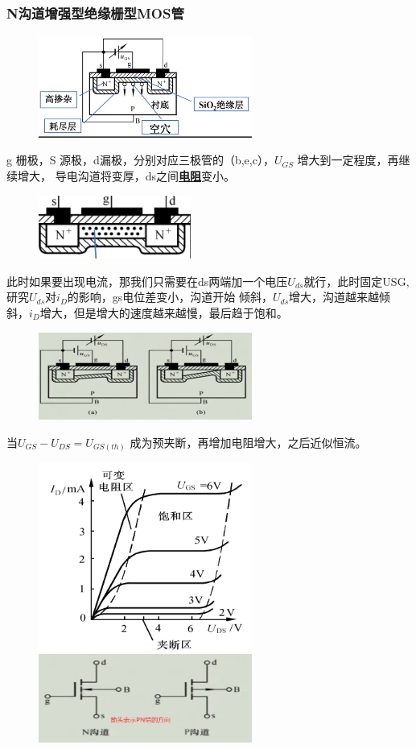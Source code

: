 \subsubsection{N沟道增强型绝缘栅型MOS管}
        \begin{figure}[H]
            \centering
            \includegraphics[width=7cm]{img/1.3.png}
            \end{figure}
g 栅极，S 源极，d漏极，分别对应三极管的（b,e,c），$U_{GS}$ 增大到一定程度，再继续增大，
导电沟道将变厚，ds之间\underline{\textbf{电阻}}变小。
        \begin{figure}[H]
            \centering
            \includegraphics[width=5cm]{img/1.4.png}
            \end{figure}
此时如果要出现电流，那我们只需要在ds两端加一个电压$U_{ds}$就行，此时固定USG,研究$U_{ds}$对$i_D$的影响，gs电位差变小，沟道开始
倾斜，$U_{ds}$增大，沟道越来越倾斜，$i_D$增大，但是增大的速度越来越慢，最后趋于饱和。
        \begin{figure}[H]
            \centering
            \includegraphics[width=7cm]{img/1.5.png}
            \end{figure}
当$\displaystyle U_{GS}-U_{DS}=U_{GS(th)}$ 成为预夹断，再增加电阻增大，之后近似恒流。
\begin{figure}[H]
    \centering
    \includegraphics[width=7cm]{img/1.6.png}
    \includegraphics[width=7cm]{img/1.7.png}
    \end{figure}
